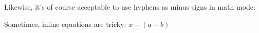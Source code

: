 \documentclass{article}
\begin{document}

Likewise, it's of course acceptable to use hyphens as minus signs in math mode: 

Sometimes, inline equations are tricky: \(x - (a - b)\)
\end{document}
